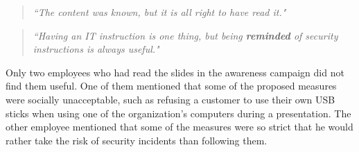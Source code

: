 \begin{quote}
\textit{``The content was known, but it is all right to have read it."}
\end{quote} 

\begin{quote}
\textit{``Having an IT instruction is one thing, but being \textbf{reminded} of security instructions is always useful."}
\end{quote}

Only two employees who had read the slides in the awareness campaign did not find them useful. One of them mentioned that some of the proposed measures were socially unacceptable, such as refusing a customer to use their own USB sticks when using one of the organization's computers during a presentation. The other employee mentioned that some of the measures were so strict that he would rather take the risk of security incidents than following them.